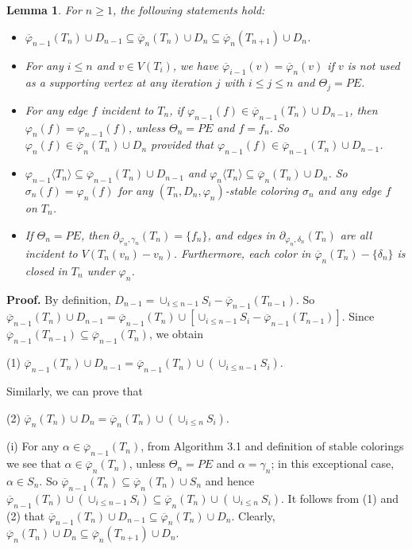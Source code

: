 \documentclass[11pt]{article}
\newtheorem{lemma}[theorem]{Lemma}
\newcommand{\phibar}{\overline{\varphi}}
\begin{document}
\begin{lemma}\label{hku}
For $n \ge 1$, the following statements hold:
\begin{itemize}
\vspace{-1.5mm}
\item[(i)] $\phibar_{n-1}(T_n)\cup D_{n-1}\subseteq \phibar_{n}(T_n)\cup D_n \subseteq \phibar_{n}(T_{n+1})\cup D_n$. 
\vspace{-1.5mm}
\item[(ii)] For any $i\leq n$ and $v\in V(T_i)$, we have $\phibar_{i-1}(v)=\phibar_n(v)$ if $v$ is not used as a supporting vertex at any 
iteration $j$ with $i \leq j\leq n$ and $\Theta_j=PE$.
\vspace{-1.5mm}
\item[(iii)] For any edge $f$ incident to $T_n$, if $\varphi_{n-1}(f) \in \phibar_{n-1}(T_n)\cup D_{n-1}$,
then $\varphi_{n}(f)=\varphi_{n-1}(f)$, unless $\Theta_n=PE$ and $f=f_n$. So $\varphi_{n}(f) \in \phibar_{n}(T_n)\cup D_n$
provided that $\varphi_{n-1}(f) \in \phibar_{n-1}(T_n)\cup D_{n-1}$.
\vspace{-1.5mm}
\item[(iv)] $\varphi_{n-1} \langle T_n \rangle \subseteq \phibar_{n-1}(T_n)\cup D_{n-1}$
and $\varphi_n \langle T_n \rangle \subseteq \phibar_n(T_n)\cup D_n$. So $\sigma_n(f)=\varphi_n(f)$ for 
any $(T_n, D_n, \varphi_n)$-stable coloring $\sigma_n$ and any edge $f$ on $T_n$.  
\vspace{-1.5mm}
\item[(v)] If $\Theta_n=PE$,  then $\partial_{\varphi_n, \gamma_n}(T_n)=\{f_n\}$, and edges in 
$\partial_{\varphi_n, \delta_n}(T_n)$ are all incident to $V(T_n(v_n)-v_n)$. Furthermore, 
each color in  $\overline{\varphi}_n(T_n)-\{\delta_n\}$ is closed in $T_n$ under $\varphi_n$.
\end{itemize} 
\end{lemma}	

{\bf Proof.} By definition, $D_{n-1}=\cup_{i\leq n-1}S_i-\phibar_{n-1}(T_{n-1})$. So $\phibar_{n-1}(T_n)\cup D_{n-1}=\phibar_{n-1}(T_n) \cup [\cup_{i\leq n-1}S_i-\phibar_{n-1}(T_{n-1})]$. Since $\phibar_{n-1}(T_{n-1}) \subseteq \phibar_{n-1}(T_n)$, we obtain 

(1) $\phibar_{n-1}(T_n)\cup D_{n-1}=\phibar_{n-1}(T_n) \cup (\cup_{i\leq n-1}S_i)$. 


\noindent Similarly, we can prove that 

(2) $\phibar_{n}(T_n)\cup D_n= \phibar_{n}(T_n)\cup (\cup_{i\leq n} S_i)$. 

(i) For any $\alpha \in \phibar_{n-1}(T_n)$, from Algorithm 3.1 and definition of stable colorings we see that $\alpha \in \phibar_{n}(T_n)$, unless $\Theta_n=PE$ and $\alpha=\gamma_n$; in this exceptional case, $\alpha  \in S_n$. 
So $\phibar_{n-1}(T_n) \subseteq \phibar_{n}(T_n) \cup S_n$ and hence $\phibar_{n-1}(T_n) \cup (\cup_{i\leq n-1}S_i) \subseteq \phibar_{n}(T_n)\cup (\cup_{i\leq n} S_i)$. It follows from (1) and (2) that $\phibar_{n-1}(T_n)\cup D_{n-1}\subseteq 
\phibar_{n}(T_n)\cup D_n$. Clearly, $\phibar_{n}(T_n)\cup D_n \subseteq \phibar_{n}(T_{n+1})\cup D_n$. 
\end{document}
